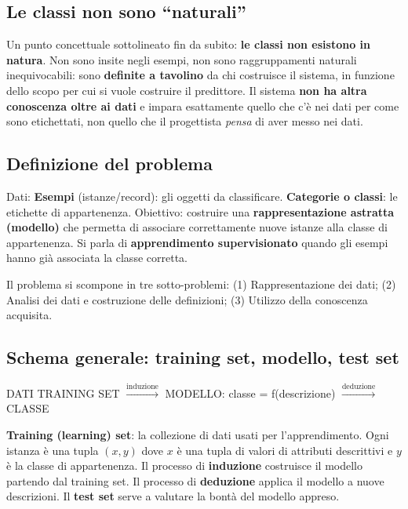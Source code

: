 \documentclass[11pt,a4paper]{report}
\begin{document}
\subsection*{Le classi non sono ``naturali''}

Un punto concettuale sottolineato fin da subito: \textbf{le classi non esistono in natura}. Non sono insite negli esempi, non sono raggruppamenti naturali inequivocabili: sono \textbf{definite a tavolino} da chi costruisce il sistema, in funzione dello scopo per cui si vuole costruire il predittore. Il sistema \textbf{non ha altra conoscenza oltre ai dati} e impara esattamente quello che c'è nei dati per come sono etichettati, non quello che il progettista \emph{pensa} di aver messo nei dati.

\subsection*{Definizione del problema}

Dati: \textbf{Esempi} (istanze/record): gli oggetti da classificare. \textbf{Categorie o classi}: le etichette di appartenenza. Obiettivo: costruire una \textbf{rappresentazione astratta (modello)} che permetta di associare correttamente nuove istanze alla classe di appartenenza. Si parla di \textbf{apprendimento supervisionato} quando gli esempi hanno già associata la classe corretta.

Il problema si scompone in tre sotto-problemi: (1) Rappresentazione dei dati; (2) Analisi dei dati e costruzione delle definizioni; (3) Utilizzo della conoscenza acquisita.

\subsection*{Schema generale: training set, modello, test set}

\begin{center}
\ttfamily
DATI TRAINING SET $\xrightarrow{\text{induzione}}$ MODELLO: classe = f(descrizione) $\xrightarrow{\text{deduzione}}$ CLASSE
\end{center}

\textbf{Training (learning) set}: la collezione di dati usati per l'apprendimento. Ogni istanza è una tupla $(x,y)$ dove $x$ è una tupla di valori di attributi descrittivi e $y$ è la classe di appartenenza. Il processo di \textbf{induzione} costruisce il modello partendo dal training set. Il processo di \textbf{deduzione} applica il modello a nuove descrizioni. Il \textbf{test set} serve a valutare la bontà del modello appreso.
\end{document}
